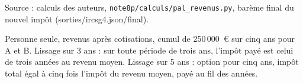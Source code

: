 Source : calculs des auteurs, \texttt{note8p/calculs/pal\_revenus.py}, barème final du nouvel impôt (sorties/ircsg4.json/final).\par Personne seule, revenus après cotisations, cumul de 250\,000~€ sur cinq ans pour A et B. Lissage sur 3 ans : sur toute période de trois ans, l'impôt payé est celui de trois années au revenu moyen. Lissage sur 5 ans : option pour cinq ans, impôt total égal à cinq fois l'impôt du revenu moyen, payé au fil des années.
